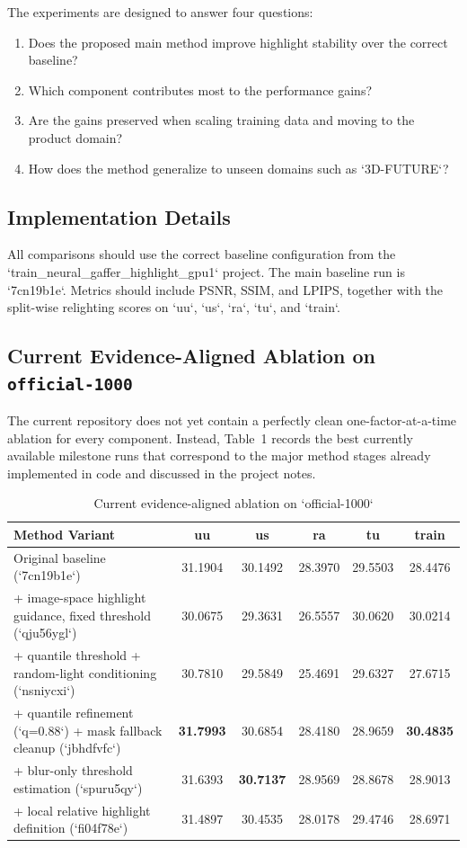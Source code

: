 \documentclass[UTF8,a4paper]{ctexart}
\begin{document}
The experiments are designed to answer four questions:

\begin{enumerate}
\item Does the proposed main method improve highlight stability over the correct baseline?
\item Which component contributes most to the performance gains?
\item Are the gains preserved when scaling training data and moving to the product domain?
\item How does the method generalize to unseen domains such as `3D-FUTURE`?
\end{enumerate}

\subsection{Implementation Details}

All comparisons should use the correct baseline configuration from the `train_neural_gaffer_highlight_gpu1` project. The main baseline run is `7cn19b1e`. Metrics should include PSNR, SSIM, and LPIPS, together with the split-wise relighting scores on `uu`, `us`, `ra`, `tu`, and `train`.

\subsection{Current Evidence-Aligned Ablation on \texttt{official-1000}}

The current repository does not yet contain a perfectly clean one-factor-at-a-time ablation for every component. Instead, Table~1 records the best currently available milestone runs that correspond to the major method stages already implemented in code and discussed in the project notes.

\begin{table}[htbp]
\centering
\caption{Current evidence-aligned ablation on `official-1000`}
\begin{tabular}{p{4.8cm}ccccc}
\toprule
Method Variant & uu & us & ra & tu & train \\
\midrule
Original baseline (`7cn19b1e`) & 31.1904 & 30.1492 & 28.3970 & 29.5503 & 28.4476 \\
+ image-space highlight guidance, fixed threshold (`qju56ygl`) & 30.0675 & 29.3631 & 26.5557 & 30.0620 & 30.0214 \\
+ quantile threshold + random-light conditioning (`nsniycxi`) & 30.7810 & 29.5849 & 25.4691 & 29.6327 & 27.6715 \\
+ quantile refinement (`q=0.88`) + mask fallback cleanup (`jbhdfvfc`) & \textbf{31.7993} & 30.6854 & 28.4180 & 28.9659 & \textbf{30.4835} \\
+ blur-only threshold estimation (`spuru5qy`) & 31.6393 & \textbf{30.7137} & 28.9569 & 28.8678 & 28.9013 \\
+ local relative highlight definition (`fi04f78e`) & 31.4897 & 30.4535 & 28.0178 & 29.4746 & 28.6971 \\
\bottomrule
\end{tabular}
\end{table}
\end{document}
